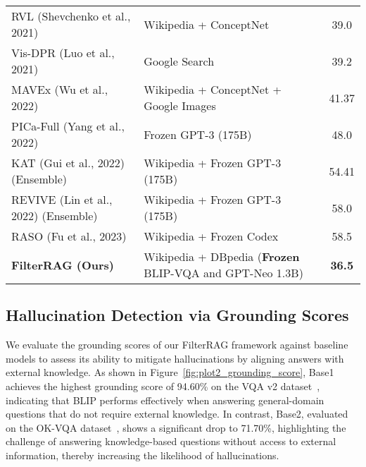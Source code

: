 \begin{table*}[t]
\begin{tabular}{l l c}
        RVL (Shevchenko et al., 2021)~\cite{shevchenko2021reasoning}                 & Wikipedia + ConceptNet                                     & 39.0                   \\
        Vis-DPR (Luo et al., 2021)~\cite{luo2021weakly}                    & Google Search                                              & 39.2                   \\
        MAVEx (Wu et al., 2022)~\cite{wu2022multi}                       & Wikipedia + ConceptNet + Google Images                    & 41.37                  \\
        PICa-Full (Yang et al., 2022)~\cite{yang2022empirical}                 & Frozen GPT-3 (175B)                                        & 48.0                   \\
        KAT (Gui et al., 2022) (Ensemble)~\cite{gui2021kat}             & Wikipedia + Frozen GPT-3 (175B)                           & 54.41                  \\
        REVIVE (Lin et al., 2022) (Ensemble)~\cite{lin2022revive}          & Wikipedia + Frozen GPT-3 (175B)                           & 58.0                   \\
        RASO (Fu et al., 2023)~\cite{fu2023generate}                        & Wikipedia + Frozen Codex                                   & 58.5                   \\
        \midrule
        \textbf{FilterRAG (Ours)}                     & Wikipedia + DBpedia (\textbf{Frozen} BLIP-VQA and GPT-Neo 1.3B)    & \textbf{36.5}          \\
        \bottomrule
    \end{tabular}
    \label{table:SOTA-OK-VQA}
\end{table*}


\subsection{Hallucination Detection via Grounding Scores}
We evaluate the grounding scores of our FilterRAG framework against baseline models to assess its ability to mitigate hallucinations by aligning answers with external knowledge. As shown in Figure~\ref{fig:plot2_grounding_score}, Base1 achieves the highest grounding score of 94.60\% on the VQA v2 dataset~\cite{goyal2017making}, indicating that BLIP performs effectively when answering general-domain questions that do not require external knowledge. In contrast, Base2, evaluated on the OK-VQA dataset~\cite{marino2019ok}, shows a significant drop to 71.70\%, highlighting the challenge of answering knowledge-based questions without access to external information, thereby increasing the likelihood of hallucinations.

